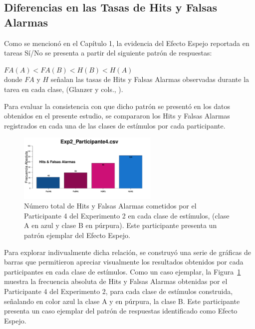 \subsection{Diferencias en las Tasas de Hits y Falsas Alarmas}

Como se mencionó en el Capítulo 1, la evidencia del Efecto Espejo reportada en tareas Sí/No se presenta a partir del siguiente patrón de respuestas:\\
 
\begin{center}
$FA(A) < FA(B) < H(B) < H(A)$\\
donde $FA$ y $H$ señalan las tasas de Hits y Falsas Alarmas observadas durante la tarea en cada clase, (Glanzer y cols., \citeyear{Glanzer1993}).\\
\end{center}

Para evaluar la consistencia con que dicho patrón se presentó en los datos obtenidos en el presente estudio, se compararon los Hits y Falsas Alarmas registrados en cada una de las clases de estímulos por cada participante.\\

\begin{figure}[h]
\centering
\includegraphics[width=0.60\textwidth]{Figures/MirrorRate_Exp2_P4}
\decoRule
\caption[Explorando datos individuales (ejemplo): Diferencias entre Hits y Falsas Alarmas registrados por clase de estímulo]{Número total de Hits y Falsas Alarmas cometidos por el Participante 4 del Experimento 2 en cada clase de estímulos, (clase A en azul y clase B en púrpura). Este participante presenta un patrón ejemplar del Efecto Espejo.}
\label{fig:MirrorRate_E2_P4}
\end{figure}

Para explorar indivualmente dicha relación, se construyó una serie de gráficas de barras que permitieron apreciar visualmente los resultados obtenidos por cada participantes en cada clase de estímulos. Como un caso ejemplar, la Figura~\ref{fig:MirrorRate_E2_P4} muestra la frecuencia absoluta de Hits y Falsas Alarmas obtenidas por el Participante 4 del Experimento 2, para cada clase de estímulos construida, señalando en color azul la clase A y en púrpura, la clase B. Este participante presenta un caso ejemplar del patrón de respuestas identificado como Efecto Espejo.\\

